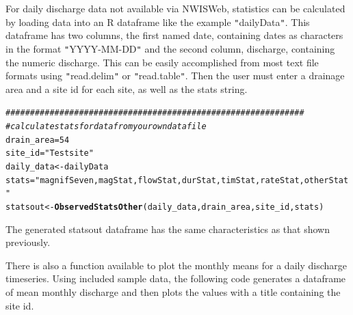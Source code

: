 \documentclass[a4paper,11pt]{article}\usepackage[]{graphicx}\usepackage[]{color}
\makeatletter
\newcommand{\hlnum}[1]{\textcolor[rgb]{0.686,0.059,0.569}{#1}}%
\newcommand{\hlstr}[1]{\textcolor[rgb]{0.192,0.494,0.8}{#1}}%
\newcommand{\hlcom}[1]{\textcolor[rgb]{0.678,0.584,0.686}{\textit{#1}}}%
\newcommand{\hlstd}[1]{\textcolor[rgb]{0.345,0.345,0.345}{#1}}%
\newcommand{\hlkwb}[1]{\textcolor[rgb]{0.69,0.353,0.396}{#1}}%
\newcommand{\hlkwd}[1]{\textcolor[rgb]{0.737,0.353,0.396}{\textbf{#1}}}%
\newenvironment{kframe}{%
 \def\at@end@of@kframe{}%
 \ifinner\ifhmode%
  \def\at@end@of@kframe{\end{minipage}}%
  \begin{minipage}{\columnwidth}%
 \fi\fi%
 \def\FrameCommand##1{\hskip\@totalleftmargin \hskip-\fboxsep
 \colorbox{shadecolor}{##1}\hskip-\fboxsep
     \hskip-\linewidth \hskip-\@totalleftmargin \hskip\columnwidth}%
 \MakeFramed {\advance\hsize-\width
   \@totalleftmargin\z@ \linewidth\hsize
   \@setminipage}}%
 {\par\unskip\endMakeFramed%
 \at@end@of@kframe}
\newenvironment{knitrout}{}{} %
\makeatother
\begin{document}
For daily discharge data not available via NWISWeb, statistics can be calculated by loading data into an R dataframe like the example \texttt{"}dailyData\texttt{"}. This dataframe has two columns, the first named date, containing dates as characters in the format \texttt{"}YYYY-MM-DD\texttt{"} and the second column, discharge, containing the numeric discharge. This can be easily accomplished from most text file formats using \texttt{"}read.delim\texttt{"} or \texttt{"}read.table\texttt{"}. Then the user must enter a drainage area and a site id for each site, as well as the stats string.

\begin{knitrout}
\color{fgcolor}\begin{kframe}
\begin{alltt}
\hlcom{#############################################################}
\hlcom{# calculate stats for data from your own data file}
\hlstd{drain_area}\hlkwb{=}\hlnum{54}
\hlstd{site_id}\hlkwb{=}\hlstr{"Test site"}
\hlstd{daily_data}\hlkwb{<-}\hlstd{dailyData}
\hlstd{stats}\hlkwb{=}\hlstr{"magnifSeven,magStat,flowStat,durStat,timStat,rateStat,otherStat"}
\hlstd{statsout} \hlkwb{<-} \hlkwd{ObservedStatsOther}\hlstd{(daily_data,drain_area,site_id,stats)}
\end{alltt}
\end{kframe}
\end{knitrout}

The generated statsout dataframe has the same characteristics as that shown previously. 

There is also a function available to plot the monthly means for a daily discharge timeseries. Using included sample data, the following code generates a dataframe of mean monthly discharge and then plots the values with a title containing the site id. 
\end{document}
